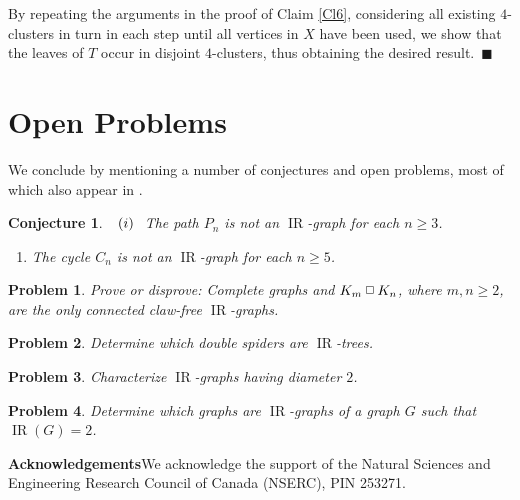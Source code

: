 \documentclass[12pt]{article}%
\newtheorem{conjecture}{Conjecture}
\newtheorem{problem}{Problem}
\providecommand{\boksie}{\ensuremath{\mathbin{\raisebox{0.3mm}{$\scriptstyle\square$}}}}
\begin{document}
By repeating the arguments in the proof of Claim \ref{Cl6}, considering all
existing $4$-clusters in turn in each step until all vertices in $X$ have been
used, we show that the leaves of $T$ occur in disjoint $4$-clusters, thus
obtaining the desired result.~$\blacksquare$

\section{Open Problems}

\label{Sec_Open}We conclude by mentioning a number of conjectures and open
problems, most of which also appear in \cite{mynhardt19}.

\begin{conjecture}
\emph{\cite{mynhardt19}}$\hspace{0.1in}(i)\hspace{0.1in}$The path $P_{n}$ is
not an $\operatorname{IR}$-graph for each $n\geq3$.

\begin{enumerate}
\item[$(ii)$] The cycle $C_{n}$ is not an $\operatorname{IR}$-graph for each
$n\geq5$.
\end{enumerate}
\end{conjecture}

\begin{problem}
\emph{\cite{mynhardt19}\hspace{0.1in}}Prove or disprove: Complete graphs and
$K_{m}\boksie K_{n}$, where $m,n\geq2$, are the only connected claw-free
$\operatorname{IR}$-graphs.
\end{problem}

\begin{problem}
\emph{\cite{mynhardt19}\hspace{0.1in}}Determine which double spiders are
$\operatorname{IR}$-trees.
\end{problem}

\begin{problem}
\emph{\cite{mynhardt19}\hspace{0.1in}}Characterize $\operatorname{IR}$-graphs
having diameter $2$.
\end{problem}

\begin{problem}
Determine which graphs are $\operatorname{IR}$-graphs of a graph $G$ such that
$\operatorname{IR}(G)=2$.
\end{problem}

\noindent\textbf{Acknowledgements\hspace{0.1in}}We acknowledge the support of
the Natural Sciences and Engineering Research Council of Canada (NSERC), PIN 253271.
\end{document}
